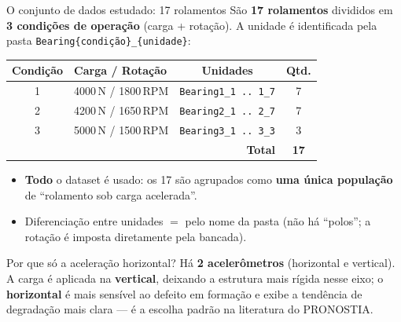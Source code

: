 \documentclass{beamer}
\begin{document}
\begin{frame}{O conjunto de dados estudado: 17 rolamentos}
    \footnotesize
    São \textbf{17 rolamentos} divididos em \textbf{3 condições de operação} (carga + rotação). A unidade é identificada pela pasta \texttt{Bearing\{condição\}\_\{unidade\}}:
    \vspace{0.1cm}

    \begin{tabular}{clcc}
        \toprule
        \textbf{Condição} & \textbf{Carga / Rotação} & \textbf{Unidades} & \textbf{Qtd.} \\
        \midrule
        1 & 4000\,N / 1800\,RPM & \texttt{Bearing1\_1 .. 1\_7} & 7 \\
        2 & 4200\,N / 1650\,RPM & \texttt{Bearing2\_1 .. 2\_7} & 7 \\
        3 & 5000\,N / 1500\,RPM & \texttt{Bearing3\_1 .. 3\_3} & 3 \\
        \midrule
        \multicolumn{3}{r}{\textbf{Total}} & \textbf{17} \\
        \bottomrule
    \end{tabular}
    \normalsize
    \vspace{0.15cm}
    \begin{itemize}
        \item \textbf{Todo} o dataset é usado: os 17 são agrupados como \textbf{uma única população} de ``rolamento sob carga acelerada''.
        \item Diferenciação entre unidades $=$ pelo nome da pasta (não há ``polos''; a rotação é imposta diretamente pela bancada).
    \end{itemize}
    \vspace{0.1cm}
    \begin{block}{Por que só a aceleração horizontal?}
        \footnotesize Há \textbf{2 acelerômetros} (horizontal e vertical). A carga é aplicada na \textbf{vertical}, deixando a estrutura mais rígida nesse eixo; o \textbf{horizontal} é mais sensível ao defeito em formação e exibe a tendência de degradação mais clara --- é a escolha padrão na literatura do PRONOSTIA.
    \end{block}
\end{frame}
\end{document}
